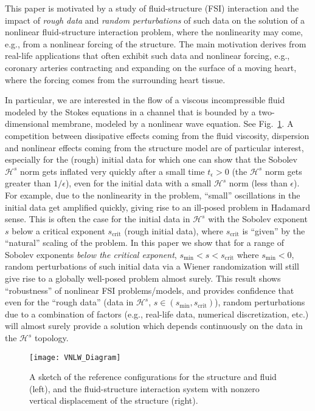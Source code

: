 \documentclass[letterpaper, 11pt,  reqno]{amsart}
\newcommand{\1}{\hspace{0.5mm}\text{I}\hspace{0.2mm}}
\renewcommand{\H}{\mathcal{H}}
\numberwithin{equation}{section}
\numberwithin{theorem}{section}
\begin{document}
This paper is motivated by a study of fluid-structure (FSI) interaction and the impact of {\emph{rough data}} and {\emph{random perturbations}} of such data
on the solution of a nonlinear fluid-structure interaction problem, where the nonlinearity may come, e.g., from a nonlinear forcing of the structure. 
The main motivation derives from real-life applications that often exhibit such data and nonlinear forcing, e.g., coronary arteries contracting and expanding
on the surface of a moving heart, where the forcing comes from the surrounding heart tissue. 

In particular, we are interested in the flow of a viscous incompressible fluid modeled by the Stokes equations
in a channel that is bounded by a two-dimensional membrane, modeled by a nonlinear wave equation. See Fig.~\ref{domain}.
A competition between dissipative effects coming from the fluid viscosity, dispersion and  nonlinear effects coming from the structure model
are of particular interest, especially for the (rough) initial data for which one can show that the Sobolev ${\H^s}$ norm gets inflated 
very quickly after a small time $t_\epsilon > 0$ (the ${\H^s}$ norm gets greater than $1/\epsilon$), 
even for the initial data with a small ${\H^s}$ norm (less than $\epsilon$). For example, due to the nonlinearity in the problem, 
``small'' oscillations in the initial data get amplified quickly, giving rise to an ill-posed problem in Hadamard sense. 
This is often the case for the initial data in ${\H^s}$  with the Sobolev exponent $s$ below a critical exponent $s_\text{crit}$ (rough initial data), 
where $s_\text{crit}$ is ``given'' by the 
``natural'' scaling of the problem. 
In this paper we show that for a range of Sobolev exponents {\emph{below the critical exponent}}, $s_\text{min} < s < s_\text{crit}$ where $s_\text{min} < 0$, random perturbations of such initial data via a Wiener randomization
will still give rise to a globally well-posed problem almost surely. 
This result shows ``robustness'' of nonlinear FSI problems/models, and provides confidence that even for the ``rough data'' (data in $\H^s$, $s\in (s_\text{min}, s_\text{crit})$),
random perturbations due to a combination of factors (e.g., real-life data, numerical discretization, etc.) will almost surely provide a solution 
which depends continuously on the data in the $\H^s$ topology.
\begin{figure}[htp!]
\center
                    \texttt{[image: VNLW\_Diagram]}
  \caption{A sketch of the reference configurations for the structure and fluid (left), and the fluid-structure interaction system with nonzero vertical displacement of the structure (right).}
\label{domain}
\end{figure}
\end{document}
